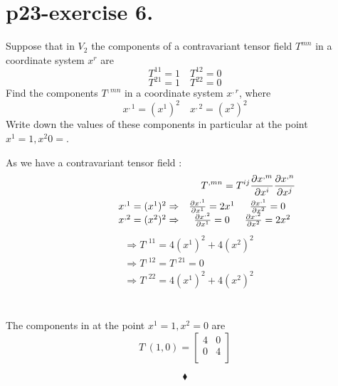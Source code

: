 \section{p23-exercise 6.}
\begin{tcolorbox}
Suppose that in $V_2$ the components of a contravariant tensor field $T^{mn}$ in a coordinate system $x^r$ are 
$$T^{11}=1 \quad T^{12}=0$$
$$T^{21}=1 \quad T^{22}=0$$
Find the components $T^{,mn}$ in a coordinate system $x^{,r}$, where
$$x^{,1} =(x^{1})^2\quad x^{,2} = (x^{2})^2$$
Write down the values of these components in particular at the point $x^1 = 1, x^2 0 =$.
\end{tcolorbox}
As we have a contravariant tensor field :
\begin{align}
\ T^{,mn} =  T^{ij}\pdv{x^{,m}}{x^{i}}\pdv{x^{,n}}{x^{j}}\\
 \begin{array}{ccc}
   \quad \quad \quad \quad  x^{,1} =(x^{1})^2  \Rightarrow & \pdv{x^{,1}}{x^{1}} = 2x^{1} & \pdv{x^{,1}}{x^{2}} = 0\\
\quad \quad \quad \quad x^{,2} =(x^{2})^2  \Rightarrow & \pdv{x^{,2}}{x^{1}} = 0 & \pdv{x^{,2}}{x^{2}} = 2x^{2}\\
  \end{array}\\
  \end{align}
  \begin{align}
  &\Rightarrow T^{,11} = 4(x^{1})^2 + 4(x^{2})^2 \\
  &\Rightarrow T^{,12} = T^{,21}=0 \\
  &\Rightarrow T^{,22} = 4(x^{1})^2 + 4(x^{2})^2
  \end{align}\\\\
  The components in  at the point $x^1 = 1, x^2 = 0$ are
  $$T^{,}(1,0) = \left[{\begin{array}{cc} 4 & 0 \\
    0 & 4 \\ 
    \end{array} } \right]$$
    
    $$\blacklozenge$$
\pagebreak[4]

